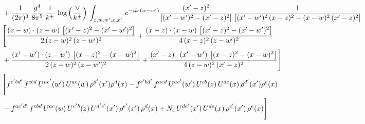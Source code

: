 \documentclass[9pt]{article}
\numberwithin{equation}{section}
\begin{document}
\begin{align}
& +\frac{1}{(2\pi)^{3}}\, \frac{g^{4}}{8\pi^{5}}\,\frac{1}{k^{+}}\,\log{\left(\frac{\vee}{k^{+}}\right)}\,\int_{z,w,w^{\prime},x,x'}\, e^{-ik\cdot (w-w')}\frac{(x'-z)^{2}}{\left[(x'-w')^{2}-(x'-z)^{2}\right]}\,\frac{1}{\left[(x'-w')^{2}\,(x-z)^{2} - (x-w)^{2}\,(x'-z)^{2}\right]}\notag \\ & \Bigg[\frac{(x-w)\cdot (z-w)\, \left[(x'-z)^{2}-(x'-w')^{2}\right]}{2\, (z-w)^{2}\, (z-w')^{2}}  + \frac{(x-z)\cdot (x-w)\,\left[(x'-z)^{2}-(x'-w')^{2}\right] }{4\,(x-z)^{2}\,(z-w')^{2}}\notag \\ & +\frac{(x'-w')\cdot (z-w')\, \left[(x-z)^{2}-(x-w)^{2}\right]}{2\, (z-w)^{2}\, (z-w')^{2}}+ \frac{(x'-z)\cdot (x'-w')\, \left[(x-z)^{2}-(x-w)^{2}\right]}{4\, (z-w)^{2}\,(x'-z)^{2}}\Bigg]\notag \\ &  \Bigg[f^{c'bd'}\,f^{cbd}\, U^{ac'}(w')\,U^{ac}(w)\,\rho^{d'}(x')\rho^{d}(x)- f^{c'bd'}\,f^{acd}\,U^{ac'}(w')\,U^{cb}(z)\,U^{de}(x)\,\rho^{d'}(x')\rho^{e}(x) \notag \\ & -f^{ac'd'}\,f^{cbd}\,U^{ac}(w)\,U^{c'b}(z)\,U^{d'e'}(x')\,\rho^{e'}(x')\,\rho^{d}(x) +N_{c}\,U^{de'}(x')\,U^{de}(x)\,\rho^{e'}(x')\,\rho^{e}(x)\Bigg]
\end{align}
\end{document}
